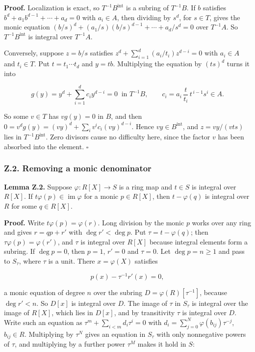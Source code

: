 \documentclass[11pt]{article}
\begin{document}
\textbf{Proof.} Localization is exact, so \(T^{-1}B^{\mathrm{int}}\) is
a subring of \(T^{-1}B\). If \(b\) satisfies
\(b^d+a_1b^{d-1}+\cdots+a_d=0\) with \(a_i\in A\), then dividing by
\(s^d\), for \(s\in T\), gives the monic equation
\((b/s)^d+(a_1/s)(b/s)^{d-1}+\cdots+a_d/s^d=0\) over \(T^{-1}A\). So
\(T^{-1}B^{\mathrm{int}}\) is integral over \(T^{-1}A\).

Conversely, suppose \(z=b/s\) satisfies
\(z^d+\sum_{i=1}^d(a_i/t_i)z^{d-i}=0\) with \(a_i\in A\) and
\(t_i\in T\). Put \(t=t_1\cdots t_d\) and \(y=tb\). Multiplying the
equation by \((ts)^d\) turns it into

\[
g(y)=y^d+\sum_{i=1}^dc_iy^{d-i}=0\ \text{ in }T^{-1}B,\qquad c_i=a_i\,\frac{t}{t_i}\,t^{\,i-1}s^i\in A .
\]

So some \(v\in T\) has \(vg(y)=0\) in \(B\), and then
\(0=v^dg(y)=(vy)^d+\sum_iv^ic_i(vy)^{d-i}\). Hence
\(vy\in B^{\mathrm{int}}\), and \(z=vy/(vts)\) lies in
\(T^{-1}B^{\mathrm{int}}\). Zero divisors cause no difficulty here,
since the factor \(v\) has been absorbed into the element. \(\square\)

\subsubsection{Z.2. Removing a monic
denominator}\label{z.2.-removing-a-monic-denominator}

\textbf{Lemma Z.2.} Suppose \(\varphi:R[X]\to S\) is a ring map and
\(t\in S\) is integral over \(R[X]\). If
\(t\varphi(p)\in\operatorname{im}\varphi\) for a monic \(p\in R[X]\),
then \(t-\varphi(q)\) is integral over \(R\) for some \(q\in R[X]\).

\textbf{Proof.} Write \(t\varphi(p)=\varphi(r)\). Long division by the
monic \(p\) works over any ring and gives \(r=qp+r'\) with
\(\deg r'<\deg p\). Put \(\tau=t-\varphi(q)\); then
\(\tau\varphi(p)=\varphi(r')\), and \(\tau\) is integral over \(R[X]\)
because integral elements form a subring. If \(\deg p=0\), then \(p=1\),
\(r'=0\) and \(\tau=0\). Let \(\deg p=n\ge1\) and pass to \(S_\tau\),
where \(\tau\) is a unit. There \(x=\varphi(X)\) satisfies

\[
p(x)-\tau^{-1}r'(x)=0,
\]

a monic equation of degree \(n\) over the subring
\(D=\varphi(R)[\tau^{-1}]\), because \(\deg r'<n\). So \(D[x]\) is
integral over \(D\). The image of \(\tau\) in \(S_\tau\) is integral
over the image of \(R[X]\), which lies in \(D[x]\), and by transitivity
\(\tau\) is integral over \(D\). Write such an equation as
\(\tau^m+\sum_{i<m}d_i\tau^i=0\) with
\(d_i=\sum_{j=0}^{N}\varphi(b_{ij})\tau^{-j}\), \(b_{ij}\in R\).
Multiplying by \(\tau^N\) gives an equation in \(S_\tau\) with only
nonnegative powers of \(\tau\), and multiplying by a further power
\(\tau^M\) makes it hold in \(S\):
\end{document}
